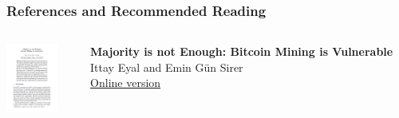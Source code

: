 \documentclass[handout]{beamer}
\begin{document}
\begin{frame}%
\frametitle{References and Recommended Reading}

		\begin{columns}[T]
			\begin{column}{0.1\textwidth}
					\includegraphics[width = 1.7cm, frame]{../assets/images/Mining_cover}
			\end{column} %
			\begin{column}{0.8\textwidth}
				\textbf{Majority is not Enough: Bitcoin Mining is Vulnerable} \\ 
				Ittay Eyal and Emin Gün Sirer \\
				\link \href{https://www.cs.cornell.edu/~ie53/publications/btcProcFC.pdf}{Online version}
			\end{column}
		\end{columns}
	

\end{frame}
\end{document}
